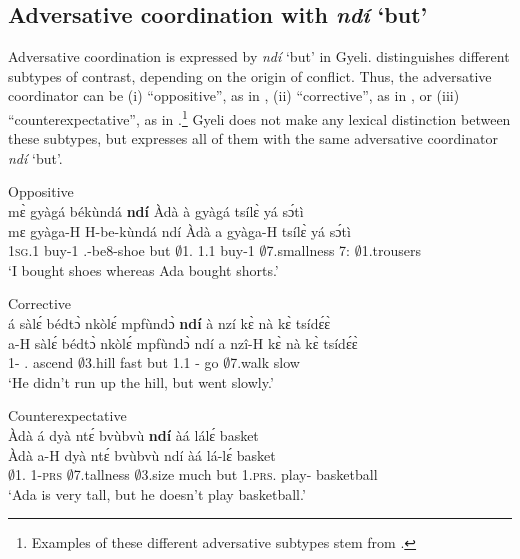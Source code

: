 \subsection{Adversative coordination with {\itshape ndí} `but'}
\label{sec:AdverseCoord}

Adversative coordination is expressed by {\itshape ndí} `but' in Gyeli.
\citet{haspelmath2007} distinguishes different subtypes of contrast, depending on the origin of conflict. Thus, the adversative coordinator can be (i) ``oppositive'', as in , (ii) ``corrective'', as in , or (iii) ``counterexpectative'', as in .\footnote{Examples of these different adversative subtypes stem from \citet{mauri2008}.} Gyeli does not make any lexical distinction between these subtypes, but expresses all of them with the same adversative coordinator {\itshape ndí} `but'.


\ea\label{but1} Oppositive\\
  \glll     mɛ̀ gyàgá békùndá {\bfseries ndí} Àdà à gyàgá tsílɛ̀ yá sɔ́tì \\
             mɛ gyàga-H H-be-kùndá ndí Àdà a gyàga-H tsílɛ̀ yá sɔ́tì \\
               1\textsc{sg}.{\PST}1 buy-{\PST}1 {\OBJ}.{\LINK}-be8-shoe but $\emptyset$1.{\PN} 1.{\PST}1 buy-{\PST}1 $\emptyset$7.smallness 7:{\ATT} $\emptyset$1.trousers \\
    \trans `I bought shoes whereas Ada bought shorts.'
\z

\newpage
\ea\label{but2} Corrective\\
  \glll     á sàlɛ́ bédtɔ̀ nkòlɛ́ mpfùndɔ̀ {\bfseries ndí} à nzí kɛ̀ nà kɛ̀ tsídɛ́ɛ̀ \\
              a-H sàlɛ́ bédtɔ̀ nkòlɛ́ mpfùndɔ̀ ndí a nzî-H kɛ̀ nà kɛ̀ tsídɛ́ɛ̀ \\
               1-{\NEG} {\PST}.{\NEG} ascend $\emptyset$3.hill fast but 1.{\PST}1 {\PROG}-{\R} go {\COM} $\emptyset$7.walk slow \\
    \trans `He didn't run up the hill, but went slowly.'
\z


\ea \label{but3} Counterexpectative\\
  \glll     Àdà á dyà ntɛ́ bvùbvù {\bfseries ndí} àá lálɛ́ basket \\
              Àdà a-H dyà ntɛ́ bvùbvù ndí àá lá-lɛ́ basket \\
               $\emptyset$1.{\PN} 1-\textsc{prs} $\emptyset$7.tallness $\emptyset$3.size much but 1.\textsc{prs}.{\NEG} play-{\NEG} basketball \\
    \trans `Ada is very tall, but he doesn't play basketball.'
\z

